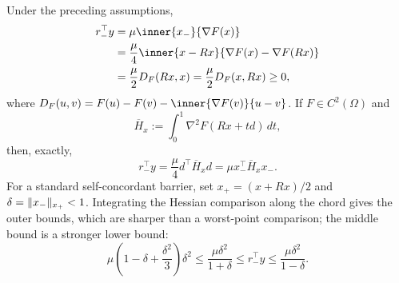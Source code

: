 \begin{theorem}
\label{thm:structural-involution-work}
Under the preceding assumptions,
\begin{align}
 r_-^\top y
 &=\mu\inner{x_-}{\nabla F(x)}                                      \notag\\
 &=\frac{\mu}{4}\inner{x-Rx}{\nabla F(x)-\nabla F(Rx)}             \label{eq:structural-work-chain}\\
 &=\frac{\mu}{2}D_F(Rx,x)
  =\frac{\mu}{2}D_F(x,Rx)\geq0,                                    \notag
\end{align}
where $D_F(u,v)=F(u)-F(v)-\inner{\nabla F(v)}{u-v}$.
If $F\in C^2(\Omega)$ and
\begin{equation}
 \overline H_x:=\int_0^1\nabla^2F(Rx+td)\,dt,
\end{equation}
then, exactly,
\begin{equation}
 r_-^\top y=\frac{\mu}{4}d^\top\overline H_xd
       =\mu x_-^\top\overline H_xx_-.                         \label{eq:structural-integrated-hessian}
\end{equation}
For a standard self-concordant barrier, set
$x_+=(x+Rx)/2$ and $\delta=\lVert x_-\rVert_{x_+}<1$.  Integrating the Hessian
comparison along the chord gives the outer bounds, which are sharper than a
worst-point comparison; the middle bound is a stronger lower bound:
\begin{equation}
 \boxed{
 \mu\left(1-\delta+\frac{\delta^2}{3}\right)\delta^2
 \leq\frac{\mu\delta^2}{1+\delta}
 \leq r_-^\top y\leq\frac{\mu\delta^2}{1-\delta}.}
                                                               \label{eq:structural-sharp-chord}
\end{equation}
\end{theorem}

